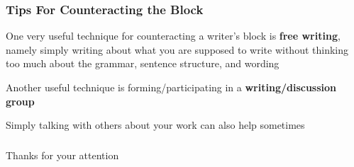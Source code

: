 \documentclass{beamer}
\begin{document}
\begin{frame}
\frametitle{Tips For Counteracting the Block}
    \vspace{-1cm}
    One very useful technique for counteracting a writer's block is \textbf{free writing}, namely simply writing about what you are supposed to write without thinking too much about the grammar, sentence structure, and wording
    \newline

    Another useful technique is forming/participating in a \textbf{writing/discussion group}
    \newline

    Simply talking with others about your work can also help sometimes
\end{frame}

\begin{frame}
\frametitle{}
    \begin{center}
        {\Huge Thanks for your attention}
    \end{center}
\end{frame}
\end{document}
